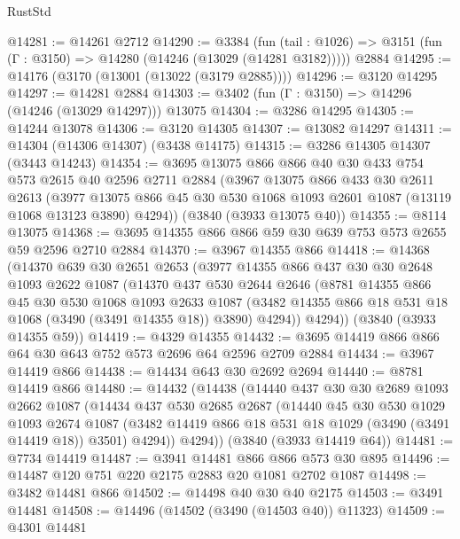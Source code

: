 \begin{lexlean}{RustStd}
\begin{coremodule}
{\begin{coremodule}
{{{{{{{{{{{{{{{{{{{{{{{{{{@14281 := @14261 @2712
@14290 := @3384
    (fun (tail : @1026) => @3151 (fun (Γ : @3150) => @14280 (@14246 (@13029 (@14281 @3182)))))
    @2884
@14295 := @14176 (@3170 (@13001 (@13022 (@3179 @2885))))
@14296 := @3120 @14295
@14297 := @14281 @2884
@14303 := @3402 (fun (Γ : @3150) => @14296 (@14246 (@13029 @14297))) @13075
@14304 := @3286 @14295
@14305 := @14244 @13078
@14306 := @3120 @14305
@14307 := @13082 @14297
@14311 := @14304 (@14306 @14307) (@3438 @14175)
@14315 := @3286 @14305 @14307 (@3443 @14243)
@14354 := @3695
    @13075
    @866
    @866
    @40
    @30
    @433
    @754
    @573
    @2615
    @40
    @2596
    @2711
    @2884
    (@3967
      @13075
      @866
      @433
      @30
      @2611
      @2613
      (@3977 @13075 @866 @45 @30 @530 @1068 @1093 @2601 @1087 (@13119 @1068 @13123 @3890) @4294))
    (@3840 (@3933 @13075 @40))
@14355 := @8114 @13075
@14368 := @3695 @14355 @866 @866 @59 @30 @639 @753 @573 @2655 @59 @2596 @2710 @2884
@14370 := @3967 @14355 @866
@14418 := @14368
    (@14370
      @639
      @30
      @2651
      @2653
      (@3977
        @14355
        @866
        @437
        @30
        @30
        @2648
        @1093
        @2622
        @1087
        (@14370
          @437
          @530
          @2644
          @2646
          (@8781
            @14355
            @866
            @45
            @30
            @530
            @1068
            @1093
            @2633
            @1087
            (@3482 @14355 @866 @18 @531 @18 @1068 (@3490 (@3491 @14355 @18)) @3890)
            @4294))
        @4294))
    (@3840 (@3933 @14355 @59))
@14419 := @4329 @14355
@14432 := @3695 @14419 @866 @866 @64 @30 @643 @752 @573 @2696 @64 @2596 @2709 @2884
@14434 := @3967 @14419 @866
@14438 := @14434 @643 @30 @2692 @2694
@14440 := @8781 @14419 @866
@14480 := @14432
    (@14438
      (@14440
        @437
        @30
        @30
        @2689
        @1093
        @2662
        @1087
        (@14434
          @437
          @530
          @2685
          @2687
          (@14440
            @45
            @30
            @530
            @1029
            @1093
            @2674
            @1087
            (@3482 @14419 @866 @18 @531 @18 @1029 (@3490 (@3491 @14419 @18)) @3501)
            @4294))
        @4294))
    (@3840 (@3933 @14419 @64))
@14481 := @7734 @14419
@14487 := @3941 @14481 @866 @866 @573 @30 @895
@14496 := @14487 @120 @751 @220 @2175 @2883 @20 @1081 @2702 @1087
@14498 := @3482 @14481 @866
@14502 := @14498 @40 @30 @40 @2175
@14503 := @3491 @14481
@14508 := @14496 (@14502 (@3490 (@14503 @40)) @11323)
@14509 := @4301 @14481
}}}}}}}}}}}}}}}}}}}}}}}}}}
\end{coremodule}}
\end{coremodule}
\end{lexlean}
